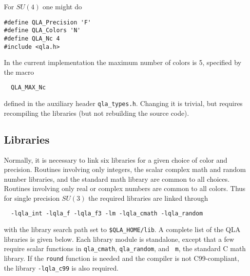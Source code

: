 \documentclass{article}
\newcommand{\ttdash}{{\tt \_}}
\begin{document}
For $SU(4)$ one might do
%
\begin{verbatim}
#define QLA_Precision 'F'
#define QLA_Colors 'N'
#define QLA_Nc 4
#include <qla.h>
\end{verbatim}
%
In the current implementation the maximum number of colors is 5,
specified by the macro
\begin{verbatim}
  QLA_MAX_Nc
\end{verbatim}
defined in the auxiliary header {\tt qla}\ttdash{\tt types.h}.
Changing it is trivial, but requires recompiling the libraries (but
not rebuilding the source code).

\subsection{Libraries}

Normally, it is necessary to link six libraries for a given choice of
color and precision.  Routines involving only integers, the scalar
complex math and random number libraries, and the standard math
library are common to all choices.  Routines involving only real or
complex numbers are common to all colors.  Thus for single precision
$SU(3)$ the required libraries are linked through
%
\begin{verbatim}
  -lqla_int -lqla_f -lqla_f3 -lm -lqla_cmath -lqla_random 
\end{verbatim}
%
with the library search path set to {\tt \$QLA}\ttdash{\tt HOME/lib}.
A complete list of the QLA libraries is given below.  Each library
module is standalone, except that a few require scalar functions in
{\tt qla}\ttdash{\tt cmath}, {\tt qla}\ttdash{\tt random}, and {\tt
m}, the standard C math library.  If the {\tt round} function is
needed and the compiler is not C99-compliant, the library {\tt -lqla\_c99}
is also required.
\end{document}
